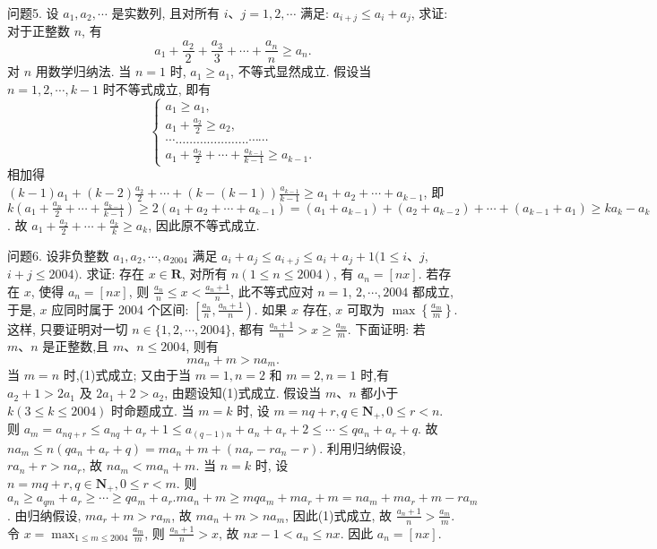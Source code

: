 问题5. 设 $a_1, a_2, \cdots$ 是实数列, 且对所有 $i 、 j=1,2, \cdots$ 满足: $a_{i+j} \leqslant a_i+a_j$, 求证: 对于正整数 $n$, 有
$$
a_1+\frac{a_2}{2}+\frac{a_3}{3}+\cdots+\frac{a_n}{n} \geqslant a_n .
$$
对 $n$ 用数学归纳法.
当 $n=1$ 时, $a_1 \geqslant a_1$, 不等式显然成立.
假设当 $n=1,2, \cdots, k-1$ 时不等式成立, 即有
$$
\left\{\begin{array}{l}
a_1 \geqslant a_1, \\
a_1+\frac{a_2}{2} \geqslant a_2, \\
\cdots \ldots \ldots \ldots \ldots \ldots \ldots . . . \cdots \cdots \\
a_1+\frac{a_2}{2}+\cdots+\frac{a_{k-1}}{k-1} \geqslant a_{k-1} .
\end{array}\right.
$$
相加得 $(k-1) a_1+(k-2) \frac{a_2}{2}+\cdots+(k-(k-1)) \frac{a_{k-1}}{k-1} \geqslant a_1+ a_2+\cdots+a_{k-1}$, 即 $k\left(a_1+\frac{a_n}{2}+\cdots+\frac{a_{k-1}}{k-1}\right) \geqslant 2\left(a_1+a_2+\cdots+a_{k-1}\right)=\left(a_1+\right. \left.a_{k-1}\right)+\left(a_2+a_{k-2}\right)+\cdots+\left(a_{k-1}+a_1\right) \geqslant k a_k-a_k$.
故 $a_1+\frac{a_2}{2}+\cdots+\frac{a_k}{k} \geqslant a_k$, 因此原不等式成立.



问题6. 设非负整数 $a_1, a_2, \cdots, a_{2004}$ 满足 $a_i+a_j \leqslant a_{i+j} \leqslant a_i+a_j+1(1 \leqslant i 、 j$, $i+j \leqslant 2004)$. 求证: 存在 $x \in \mathbf{R}$, 对所有 $n(1 \leqslant n \leqslant 2004)$, 有 $a_n= [n x]$.
若存在 $x$, 使得 $a_n=[n x]$, 则 $\frac{a_n}{n} \leqslant x<\frac{a_n+1}{n}$, 此不等式应对 $n=1$, $2, \cdots, 2004$ 都成立, 于是, $x$ 应同时属于 2004 个区间: $\left[\frac{a_n}{n}, \frac{a_n+1}{n}\right)$. 如果 $x$ 存在, $x$ 可取为 $\max \left\{\frac{a_m}{m}\right\}$.
这样, 只要证明对一切 $n \in\{1,2, \cdots, 2004\}$, 都有 $\frac{a_n+1}{n}>x \geqslant \frac{a_m}{m}$.
下面证明: 若 $m 、 n$ 是正整数,且 $m 、 n \leqslant 2004$, 则有
$$
m a_n+m>n a_m . \label{(1)}
$$
当 $m=n$ 时,(1)式成立; 又由于当 $m=1, n=2$ 和 $m=2, n=1$ 时,有 $a_2+1>2 a_1$ 及 $2 a_1+2>a_2$, 由题设知(1)式成立.
假设当 $m 、 n$ 都小于 $k(3 \leqslant k \leqslant 2004)$ 时命题成立.
当 $m=k$ 时, 设 $m=n q+r, q \in \mathbf{N}_{+}, 0 \leqslant r<n$. 则 $a_m=a_{n q+r} \leqslant a_{n q}+a_r+ 1 \leqslant a_{(q-1) n}+a_n+a_r+2 \leqslant \cdots \leqslant q a_n+a_r+q$. 故 $n a_m \leqslant n\left(q a_n+a_r+q\right)=m a_n+ m+\left(n a_r-r a_n-r\right)$. 利用归纳假设, $r a_n+r>n a_r$, 故 $n a_m<m a_n+m$.
当 $n=k$ 时, 设 $n=m q+r, q \in \mathbf{N}_{+}, 0 \leqslant r<m$. 则 $a_n \geqslant a_{q m}+a_r \geqslant \cdots \geqslant q a_m+a_r . m a_n+m \geqslant m q a_m+m a_r+m=n a_m+m a_r+m-r a_m$. 由归纳假设, $m a_r+m>r a_m$, 故 $m a_n+m>n a_m$, 因此(1)式成立, 故 $\frac{a_n+1}{n}>\frac{a_m}{m}$. 令 $x= \max _{1 \leqslant m \leqslant 2004} \frac{a_m}{m}$, 则 $\frac{a_n+1}{n}>x$, 故 $n x-1<a_n \leqslant n x$. 因此 $a_n=[n x]$.




